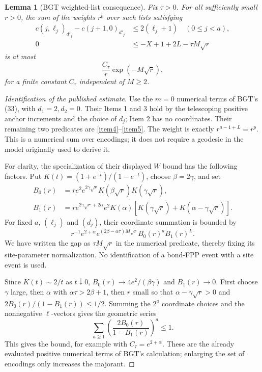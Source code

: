 \documentclass[11pt]{article}
\newtheorem{lemma}{Lemma}
\begin{document}
\begin{lemma}[BGT weighted-list consequence]\label{list}
Fix $\tau>0$. For all sufficiently small $r>0$, the sum of the
weights $r^p$ over such lists satisfying
\begin{align}
 c(j,\ell_j)_{d'_j}-c(j+1,0)_{d'_j}
       &\le2(\ell_j+1) \quad(0\le j<a),\label{item4}\\
 0&\le-X+1+2L-\tau M\sqrt r\label{item5}
\end{align}
is at most
\[
 \frac{C_\tau}{r}\exp(-M\sqrt r),
\]
for a finite constant $C_\tau$ independent of $M\ge2$.
\end{lemma}

\begin{proof}[Identification of the published estimate]
Use the $m=0$ numerical terms of BGT's (33), with
$d_1=2,d_2=0$. Their Items 1 and 3 hold by the telescoping positive
anchor increments and the choice of $d_j$; Item 2 has no coordinates.
Their remaining two predicates are \eqref{item4}--\eqref{item5}.
The weight is exactly $r^{a-1+L}=r^p$. This is a numerical sum over
encodings; it does not require a geodesic in the model originally
used to derive it.

For clarity, the specialization of their displayed $W$ bound has
the following factors. Put $K(t)=(1+e^{-t})/(1-e^{-t})$, choose
$\beta=2\gamma$, and set
\begin{align*}
 B_0(r)&=r e^2 e^{2\gamma\sqrt r}
                   K(\beta\sqrt r)K(\gamma\sqrt r),\\
 B_1(r)&=r e^{2\gamma\sqrt r+2\alpha} e^2 K(\alpha)
                   [K(\gamma\sqrt r)+K(\alpha-\gamma\sqrt r)].
\end{align*}
For fixed $a$, $(\ell_j)$ and $(d_j)$, their coordinate summation is
bounded by
\[
 r^{-1}e^{2+\alpha}
 e^{(2\beta-\alpha\tau)M\sqrt r}
 B_0(r)^a B_1(r)^L.
\]
We have written the gap as $\tau M\sqrt r$ in the numerical
predicate, thereby fixing its site-parameter normalization. No
identification of a bond-FPP event with a site event is used.

Since $K(t)\sim2/t$ as $t\downarrow0$,
$B_0(r)\to4e^2/(\beta\gamma)$ and $B_1(r)\to0$.
First choose $\gamma$ large, then $\alpha$ with
$\alpha\tau>2\beta+1$, then $r$ small so that
$\alpha-\gamma\sqrt r>0$ and
$2B_0(r)/(1-B_1(r))\le1/2$.
Summing the $2^a$ coordinate choices and the nonnegative
$\ell$-vectors gives the geometric series
\[
 \sum_{a\ge1}\left(\frac{2B_0(r)}{1-B_1(r)}\right)^a\le1.
 \]
 This gives the bound, for example with $C_\tau=e^{2+\alpha}$.
These are the already evaluated positive numerical terms of BGT's
calculation; enlarging the set of encodings only increases the
majorant.
\end{proof}
\end{document}
